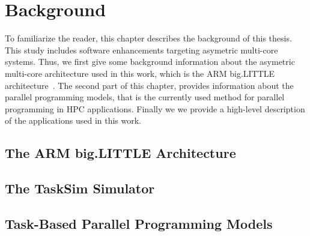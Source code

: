 \chapter{Background}
To familiarize the reader, this chapter describes the background of this thesis. 
This study includes software enhancements targeting asymetric multi-core systems.
Thus, we first give some background information about the asymetric multi-core architecture used in this work, which is the ARM big.LITTLE architecture~\cite{Greenhalgh2011}.
The second part of this chapter, provides information about the parallel programming models, that is the currently used method for parallel programming in HPC applications.
Finally we we provide a high-level description of the applications used in this work.

\section{The ARM big.LITTLE Architecture}
\label{sec.background.arm}


\section{The TaskSim Simulator}


\section{Task-Based Parallel Programming Models}
\label{sec.background.taskbased}




